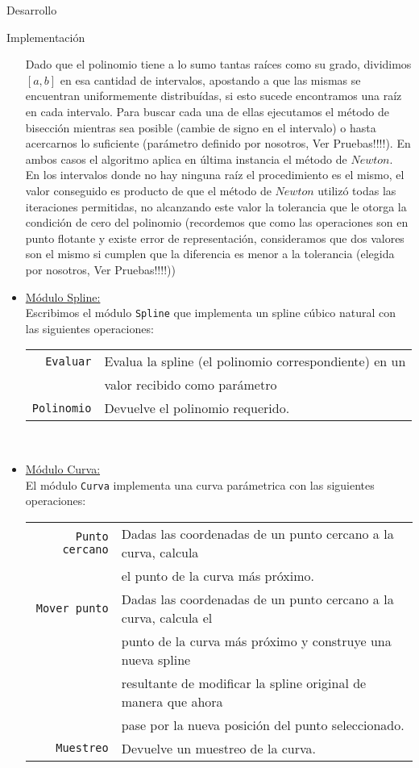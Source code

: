 \begin{section}{Desarrollo}
\begin{subsection}{Implementación}
\begin{itemize}
				Dado que el polinomio tiene a lo sumo tantas raíces como su grado, dividimos $[a,b]$ en esa cantidad de intervalos, apostando a que
				las mismas se encuentran uniformemente distribuídas, si esto sucede encontramos una raíz en cada intervalo. Para buscar cada una de 
				ellas ejecutamos el método de bisección mientras sea posible (cambie de signo en el intervalo) o hasta acercarnos lo suficiente
				(parámetro definido por nosotros, Ver Pruebas!!!!). En ambos casos el algoritmo aplica en última instancia el método de $Newton$.\\
				En los intervalos donde no hay ninguna raíz el procedimiento es el mismo, el valor conseguido es producto de que el método de 
				$Newton$ utilizó todas las iteraciones permitidas, no alcanzando este valor la tolerancia que le otorga la condición de cero del
				polinomio (recordemos que como las operaciones son en punto flotante y existe error de representación, consideramos que dos valores
				son el mismo si cumplen que la diferencia es menor a la tolerancia (elegida por nosotros, Ver Pruebas!!!!))
				
		
			\item \underline{Módulo Spline:}\\
				Escribimos el módulo \texttt{Spline} que implementa un spline cúbico natural con las siguientes operaciones:\\
				
				\begin{tabular}{rl}
					\texttt{Evaluar} & Evalua la spline (el polinomio correspondiente) en un\\
									 & valor recibido como parámetro\\
					\texttt{Polinomio} & Devuelve el polinomio requerido.\\
				\end{tabular}\\

			\item \underline{Módulo Curva:}\\
				El módulo \texttt{Curva} implementa una curva parámetrica con las siguientes operaciones:\\
				
				\begin{tabular}{rl}
					\texttt{Punto cercano} & Dadas las coordenadas de un punto cercano a la curva, calcula\\
										   & el punto de la curva más próximo.\\
					\texttt{Mover punto} & Dadas las coordenadas de un punto cercano a la curva, calcula el\\
										 & punto de la curva más próximo y construye una nueva spline\\
										 & resultante de modificar la spline original de manera que ahora\\
										 & pase por la nueva posición del punto seleccionado.\\
					\texttt{Muestreo} & Devuelve un muestreo de la curva.\\
				\end{tabular}\\
				

\end{itemize}
\end{subsection}
\end{section}
